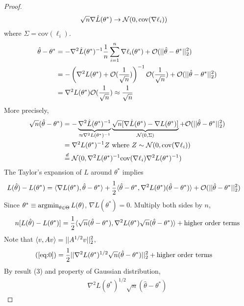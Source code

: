 \documentclass[11pt]{article}
\newcommand{\thetahat}[0]{\hat{\theta}}
\newcommand{\eqd}[0]{\overset{d}{=}}
\newcommand{\inv}[0]{^{-1}}
\newcommand{\cov}[0]{\text{cov}}
\begin{document}
\begin{proof}
\begin{align}
			\sqrt{n}\nabla \hat{L}(\theta^*) &\to \mc{N}(0, \cov(\nabla \ell_i))
		\end{align}
		where $\Sigma = \cov(\ell_i)$.
		\begin{align}
			\thetahat - \theta^* &= - \nabla^2 \hat{L}(\theta^*)\inv \frac{1}{n}\sum_{i=1}^n \nabla \ell_i(\theta^*) + \mc{O}(\norm{\thetahat - \theta^*}_2^2) \\
			&= - \left(\nabla^2 L(\theta^*) + \mc{O}(\frac{1}{\sqrt{n}})\right)\inv \mc{O}(\frac{1}{\sqrt{n}}) + \mc{O}(\norm{\thetahat - \theta^*}_2^2) \\
			&= \nabla^2 L(\theta^*) \mc{O}(\frac{1}{\sqrt{n}}) \approx \frac{1}{\sqrt{n}}
		\end{align}
		More precisely,
		\begin{align}
			\sqrt{n}(\thetahat - \theta^*) &= - \underbrace{\nabla^2 \hat{L}(\theta^*)\inv}_{\approx \nabla^2 L(\theta^*)\inv}
			\underbrace{\sqrt{n}[\nabla \hat{L}(\theta^*) - \nabla L(\theta^*)]}_{\mc{N}(0, \Sigma)}
			+ \mc{O}(\norm{\thetahat - \theta^*}_2^2) \\
			&= \nabla^2 L(\theta^*)\inv Z \tx{ where } Z \sim \mc{N}(0, \cov(\nabla \ell_i)) \\
			&\eqd \mc{N}(0, \nabla^2 L(\theta^*)\inv \cov(\nabla \ell_i) \nabla^2 L(\theta^*)\inv)
		\end{align}
		The Taylor's expansion of $L$ around $\theta^*$ implies
		\begin{align}
			L(\thetahat) - L(\theta^*) &= \inner{\nabla L(\theta^*)}{\thetahat - \theta^*} + \frac{1}{2} \inner{\thetahat - \theta^*}{\nabla^2 L(\theta^*) (\thetahat - \theta^*)} + \mc{O}(\norm{\thetahat - \theta^*}_2^2)
		\end{align}
		Since $\theta^* \equiv \operatorname*{argmin}_{\theta \in \Theta} L(\theta)$, $\nabla L(\theta^*) = 0$. Multiply both sides by $n$,
		\begin{align}
			n[L(\thetahat) - L(\theta^*)] = \frac{1}{2} \inner{\sqrt{n}(\thetahat - \theta^*)}{\nabla^2 L(\theta^*) \sqrt{n} (\thetahat - \theta^*)} + \tx{higher order terms} \label{eq:0}
		\end{align}	
		Note that $\langle {v}, {Av} \rangle = \vert \vert {A^{1/2}v} \vert \vert_2^2$,
		\begin{align}
			(\ref{eq:0}) &= \frac{1}{2} \norm{
				\nabla^2 L(\theta^*)^{1/2} \sqrt{n}(\thetahat - \theta^*) 
			}_2^2 + \tx{higher order terms} \label{eq:1}
		\end{align}
		By result (3) and property of Gaussian distribution,
		\begin{align}
			\nabla^2 L(\theta^*)^{1/2} \sqrt{n}(\thetahat - \theta^*)

\end{align}
\end{proof}
\end{document}
